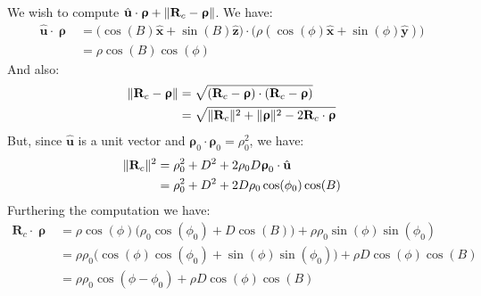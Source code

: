             We wish to compute
            $\hat{\mathbf{u}}\cdot%
             \boldsymbol{\uprho}+%
             \norm{\mathbf{R}_{c}-\boldsymbol{\uprho}}$.
            We have:
            \begin{subequations}
                \begin{align}
                    \hat{\mathbf{u}}\cdot\boldsymbol{\uprho}
                    &=\big(\cos(B)\hat{\mathbf{x}}+
                           \sin(B)\hat{\mathbf{z}}\big)
                        \cdot\big(\rho(\cos(\phi)\hat{\mathbf{x}}+
                                  \sin(\phi)\hat{\mathbf{y}})\big)\\
                    &=\rho\cos(B)\cos(\phi)
                \end{align}
            \end{subequations}
            And also:
            \begin{subequations}
                \begin{align}
                    \lVert\mathbf{R}_{c}-\boldsymbol{\uprho}\rVert
                    &=\sqrt{(\mathbf{R}_{c}-
                    \boldsymbol{\uprho})\cdot(\mathbf{R}_{c}-
                    \boldsymbol{\uprho})}\\
                    &=\sqrt{\lVert\mathbf{R}_{c}\rVert^2+
                    \lVert\boldsymbol{\uprho}\rVert^2-
                    2\mathbf{R}_{c}\cdot\boldsymbol{\uprho}}
                \end{align}
            \end{subequations}
            But, since $\hat{\mathbf{u}}$ is a unit vector and
            $\boldsymbol{\rho}_{0}\cdot\boldsymbol{\rho}_{0}%
             =\rho_{0}^{2}$,
            we have:
            \begin{subequations}
                \begin{align}
                    \lVert\mathbf{R}_{c}\rVert^{2}
                    &=\rho_{0}^2+D^{2}+2\rho_{0}D
                    \boldsymbol{\uprho}_{0}\cdot\hat{\mathbf{u}}\\
                    &=\rho_{0}^2+D^{2}+
                    2D\rho_{0}\cos(\phi_{0})\cos(B)
                \end{align}
            \end{subequations}
            Furthering the computation we have:
            \begin{subequations}
                \begin{align}
                    \mathbf{R}_{c}\cdot\boldsymbol{\uprho}
                    &=\rho\cos(\phi)
                    \big(\rho_{0}\cos(\phi_{0})+D\cos(B)\big)+
                    \rho\rho_{0}\sin(\phi)\sin(\phi_{0})\\
                    &=\rho\rho_{0}
                    \big(\cos(\phi)\cos(\phi_{0})+
                         \sin(\phi)\sin(\phi_{0})\big)+
                    \rho{D}\cos(\phi)\cos(B)\\
                    &=\rho\rho_{0}\cos(\phi-\phi_{0})+
                    \rho{D}\cos(\phi)\cos(B)
                \end{align}
            \end{subequations}

